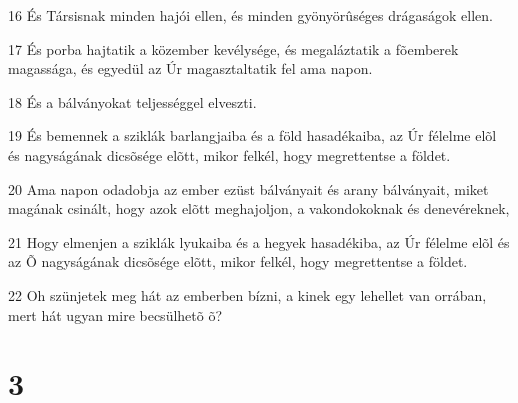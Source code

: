 \par 16 És Társisnak minden hajói ellen, és minden gyönyörûséges drágaságok ellen.
\par 17 És porba hajtatik a közember kevélysége, és megaláztatik a fõemberek magassága, és egyedül az Úr magasztaltatik fel ama napon.
\par 18 És a bálványokat teljességgel elveszti.
\par 19 És bemennek a sziklák barlangjaiba és a föld hasadékaiba, az Úr félelme elõl és nagyságának dicsõsége elõtt, mikor felkél, hogy megrettentse a földet.
\par 20 Ama napon odadobja az ember ezüst bálványait és arany bálványait, miket magának csinált, hogy azok elõtt meghajoljon, a vakondokoknak és denevéreknek,
\par 21 Hogy elmenjen a sziklák lyukaiba és a hegyek hasadékiba, az Úr félelme elõl és az Õ nagyságának dicsõsége elõtt, mikor felkél, hogy megrettentse a földet.
\par 22 Oh szünjetek meg hát az emberben bízni, a kinek egy lehellet van orrában, mert hát ugyan mire becsülhetõ õ?

\chapter{3}


